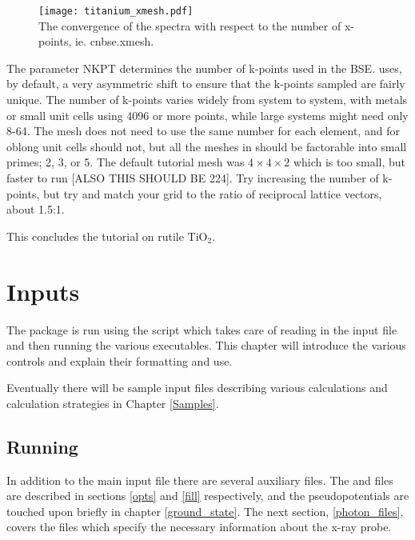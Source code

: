\documentclass[11pt]{report}
\begin{document}
\begin{figure}
\texttt{[image: titanium\_xmesh.pdf]} \\
The convergence of the spectra with respect to the number of x-points, ie. cnbse.xmesh.
\label{titanium_xmesh}
\end{figure}

The parameter NKPT determines the number of k-points used in the BSE.  uses, by default, a very asymmetric shift to ensure that the k-points sampled are fairly unique. The number of k-points varies widely from system to system, with metals or small unit cells using 4096 or more points, while large systems might need only 8-64. The mesh does not need to use the same number for each element, and for oblong unit cells should not, but all the meshes in  should be factorable into small primes; 2, 3, or 5. The default tutorial mesh was $4\times4\times2$ which is too small, but faster to run [ALSO THIS SHOULD BE 224]. Try increasing the number of k-points, but try and match your grid to the ratio of reciprocal lattice vectors, about 1.5:1. 

This concludes the tutorial on rutile TiO$_2$.





\chapter{Inputs}

The  package is run using the  script  which takes care of reading in the input file and then running the various executables. This chapter will introduce the various controls and explain their formatting and use.

Eventually there will be sample input files describing various calculations and calculation strategies in Chapter \ref{Samples}.

\section{Running \OCEAN}

In addition to the main input file there are several auxiliary files. The  and  files are described in sections \ref{opts}  and \ref{fill} respectively, and the pseudopotentials are touched upon briefly in chapter \ref{ground_state}. The next section, \ref{photon_files}, covers the  files which specify the necessary information about the x-ray probe. 
\end{document}
